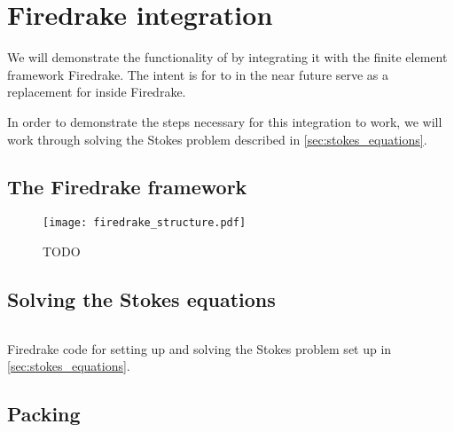 \documentclass[thesis]{subfiles}
\begin{document}
\chapter{Firedrake integration}

We will demonstrate the functionality of  by integrating it with the finite element framework Firedrake.
The intent is for  to in the near future serve as a replacement for  inside Firedrake.

In order to demonstrate the steps necessary for this integration to work, we will work through solving the Stokes problem described in \cref{sec:stokes_equations}.

\section{The Firedrake framework}

\begin{figure}
  \texttt{[image: firedrake\_structure.pdf]}
  \caption{TODO}
  \label{fig:firedrake_structure}
\end{figure}


\section{Solving the Stokes equations}

\begin{listing}
  \centering
  \begin{minipage}{.9\textwidth}
    \inputminted{python}{./scripts/stokes_demo.py}
  \end{minipage}
  \caption{
    Firedrake code for setting up and solving the Stokes problem set up in \cref{sec:stokes_equations}.
  }
  \label{listing:stokes_demo}
\end{listing}




\section{Packing}
\end{document}
